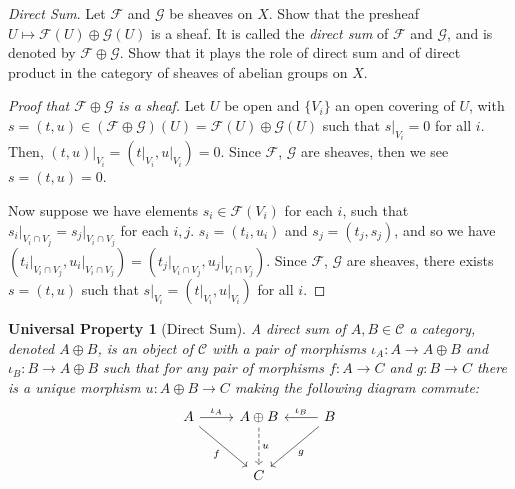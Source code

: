 \documentclass[10pt]{article}
\newtheorem*{universalproperty}{Universal Property}
\theoremstyle{definition}
\theoremstyle{remark}
\numberwithin{equation}{section}
\numberwithin{figure}{subsubsection}
\begin{document}
\begin{problem}
  \emph{Direct Sum}. Let $\mathscr{F}$ and $\mathscr{G}$ be sheaves on $X$. Show that the presheaf $U \mapsto \mathscr{F}(U) \oplus \mathscr{G}(U)$ is a sheaf. It is called the \emph{direct sum} of $\mathscr{F}$ and $\mathscr{G}$, and is denoted by $\mathscr{F} \oplus \mathscr{G}$. Show that it plays the role of direct sum and of direct product in the category of sheaves of abelian groups on $X$.
\end{problem}
\begin{proof}[Proof that $\mathscr{F} \oplus \mathscr{G}$ is a sheaf]
  Let $U$ be open and $\{V_i\}$ an open covering of $U$, with $s = (t,u) \in (\mathscr{F} \oplus \mathscr{G})(U) = \mathscr{F}(U) \oplus \mathscr{G}(U)$ such that $s\vert_{V_i} = 0$ for all $i$. Then, $(t,u)\vert_{V_i} = (t\vert_{V_i}, u\vert_{V_i}) = 0$. Since $\mathscr{F}$, $\mathscr{G}$ are sheaves, then we see $s = (t,u) = 0$.
  \par Now suppose we have elements $s_i \in \mathscr{F}(V_i)$ for each $i$, such that $s_i\vert_{V_i \cap V_j} = s_j\vert_{V_i \cap V_j}$ for each $i,j$. $s_i = (t_i,u_i)$ and $s_j = (t_j,s_j)$, and so we have $(t_i\vert_{V_i \cap V_j},u_i\vert_{V_i \cap V_j}) = (t_j\vert_{V_i \cap V_j},u_j\vert_{V_i \cap V_j})$. Since $\mathscr{F}$, $\mathscr{G}$ are sheaves, there exists $s = (t,u)$ such that $s\vert_{V_i} = (t\vert_{V_i},u\vert_{V_i})$ for all $i$.
\end{proof}
\begin{universalproperty}[Direct Sum]
  A \emph{direct sum} of $A,B \in \mathscr{C}$ a category, denoted $A \oplus B$, is an object of $\mathscr{C}$ with a pair of morphisms $\iota_A\colon A \to A \oplus B$ and $\iota_B\colon B \to A \oplus B$ such that for any pair of morphisms $f\colon A \to C$ and $g\colon B \to C$ there is a unique morphism $u \colon A \oplus B \to C$ making the following diagram commute:
  \begin{equation*}
    \begin{tikzcd}[row sep=large]
      A \rar{\iota_A}\arrow{dr}[swap]{f} & A \oplus B\dar[dashed]{u} & B\lar[swap]{\iota_B}\arrow{dl}{g}\\
      & C
    \end{tikzcd}
  \end{equation*}
\end{universalproperty}
\end{document}
